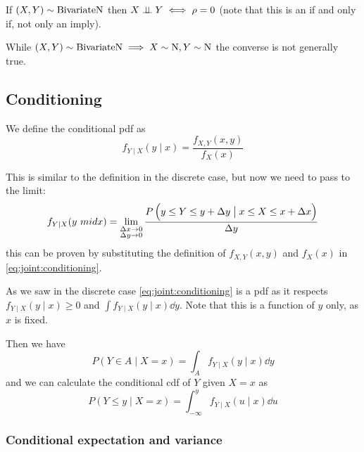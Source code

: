 \documentclass[14pt]{extarticle}
\newcommand{\Normal}{{\operatorfont N}}
\newcommand{\BivariateNormal}{{\operatorfont BivariateN}}
\begin{document}
\begin{remark}
    If $(X, Y) \sim \BivariateNormal$ then $X \perp \!\!\! \perp Y \iff \rho = 0$ (note that this is an if and only if, not only an imply).
\end{remark}

\begin{remark}
    While $(X, Y) \sim \BivariateNormal \implies X \sim \Normal, Y \sim \Normal$ the converse is not generally true.
\end{remark}

\subsection{Conditioning}

\begin{definition}
    We define the conditional pdf as
    \begin{equation}
        f_{Y \mid X}(y \mid x) = \frac{f_{X, Y}(x, y)}{f_X(x)} \label{eq:joint:conditioning}
    \end{equation}
\end{definition}

This is similar to the definition in the discrete case, but now we need to pass to the limit:
\begin{equation}
    f_{Y \mid X}(y\ mid x) = \lim_{\substack{\Delta x \to 0 \\ \Delta y \to 0}} \frac{P\left(y \leq Y \leq y + \Delta y \bigm| x \leq X \leq x + \Delta x\right)}{\Delta y}
\end{equation}
this can be proven by substituting the definition of $f_{X, Y}(x,y)$ and $f_X(x)$ in \autoref{eq:joint:conditioning}.


As we saw in the discrete case \autoref{eq:joint:conditioning} is a pdf as it respects $f_{Y \mid X}(y \mid x) \geq 0$ and $\int f_{Y \mid X}(y \mid x) \dd{y}$.
Note that this is a function of $y$ only, as $x$ is fixed.

Then we have
\begin{equation}
    P(Y \in A \mid X = x) = \int_A f_{Y \mid X}(y \mid x) \dd{y}
\end{equation}
and we can calculate the conditional cdf of $Y$ given $X = x$ as
\begin{equation}
    P(Y \leq y  \mid  X = x) = \int_{-\infty}^y f_{Y \mid X}(u \mid x) \dd{u}
\end{equation}

\subsubsection{Conditional expectation and variance}
\end{document}
